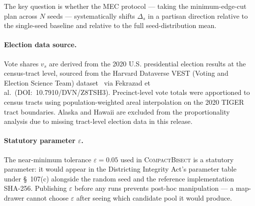 The key question is whether the MEC protocol --- taking the minimum-edge-cut
plan across $N$ seeds --- systematically shifts $\Delta_s$ in a partisan
direction relative to the single-seed baseline and relative to the full
seed-distribution mean.

\paragraph{Election data source.}
Vote shares $v_s$ are derived from the 2020 U.S. presidential election results
at the census-tract level, sourced from the Harvard Dataverse VEST (Voting and
Election Science Team) dataset~\citep{Kuriwaki2023} via Fekrazad et al.\
(DOI:~10.7910/DVN/Z8TSH3). Precinct-level vote totals were apportioned to
census tracts using population-weighted areal interpolation on the 2020 TIGER
tract boundaries. Alaska and Hawaii are excluded from the proportionality
analysis due to missing tract-level election data in this release.

\paragraph{Statutory parameter $\varepsilon$.}
The near-minimum tolerance $\varepsilon = 0.05$ used in \textsc{CompactBisect}
is a statutory parameter: it would appear in the Districting Integrity Act's
parameter table under \S~107(c) alongside the random seed and the reference
implementation SHA-256. Publishing $\varepsilon$ before any runs prevents
post-hoc manipulation --- a map-drawer cannot choose $\varepsilon$ after seeing
which candidate pool it would produce.
